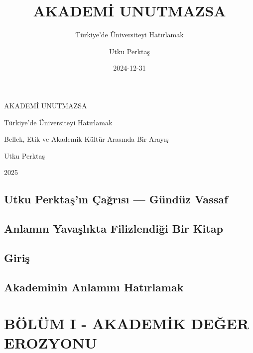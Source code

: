 \documentclass[
  letterpaper,
  DIV=11,
  numbers=noendperiod]{scrreprt}
\title{AKADEMİ UNUTMAZSA}
\subtitle{Türkiye'de Üniversiteyi Hatırlamak}
\author{Utku Perktaş}
\date{2024-12-31}
\renewcommand*\contentsname{Table of contents}
\newcommand\contentsname{Table of contents}
\begin{document}
\maketitle

\renewcommand*\contentsname{Table of contents}
{
\hypersetup{linkcolor=}
\setcounter{tocdepth}{2}
\tableofcontents
}


\chapter{}\label{section}

{ AKADEMİ UNUTMAZSA }

{ Türkiye'de Üniversiteyi Hatırlamak }

{ Bellek, Etik ve Akademik Kültür Arasında Bir Arayış }

{ Utku Perktaş }

{ 2025 }

\newpage


\chapter{Utku Perktaş'ın Çağrısı --- Gündüz
Vassaf}\label{utku-perktaux15fux131n-uxe7aux11frux131sux131-guxfcnduxfcz-vassaf}


\chapter{Anlamın Yavaşlıkta Filizlendiği Bir
Kitap}\label{anlamux131n-yavaux15flux131kta-filizlendiux11fi-bir-kitap}


\chapter{Giriş}\label{giriux15f}


\chapter{Akademinin Anlamını
Hatırlamak}\label{akademinin-anlamux131nux131-hatux131rlamak}

\part{BÖLÜM I - AKADEMİK DEĞER EROZYONU}
\end{document}
